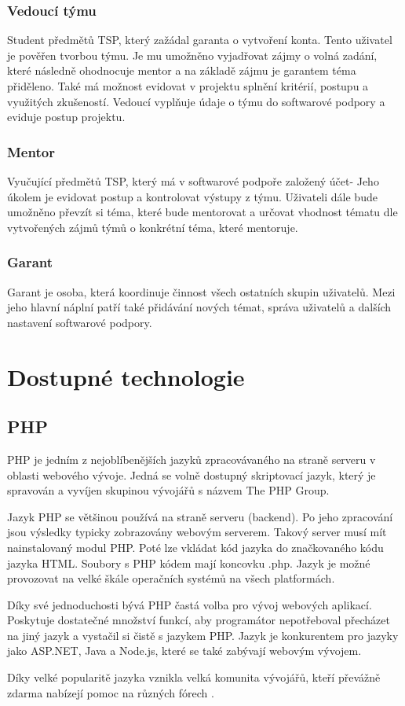 \documentclass[czech,BP]{thesiskiv}
\begin{document}
	\subsection{Vedoucí týmu}
		\par Student předmětů TSP, který zažádal garanta o vytvoření konta. Tento uživatel je pověřen tvorbou týmu. Je mu umožněno vyjadřovat zájmy o volná zadání, které následně ohodnocuje mentor a na základě zájmu je garantem téma přiděleno. Také má možnost evidovat v projektu splnění kritérií, postupu a využitých zkušeností. Vedoucí vyplňuje údaje o týmu do softwarové podpory a eviduje postup projektu.
	\subsection{Mentor}
		\par Vyučující předmětů TSP, který má v softwarové podpoře založený účet- Jeho úkolem je evidovat postup a kontrolovat výstupy z týmu. Uživateli dále bude umožněno převzít si téma, které bude mentorovat a určovat vhodnost tématu dle vytvořených zájmů týmů o konkrétní téma, které mentoruje.
	\subsection{Garant}
		\par Garant je osoba, která koordinuje činnost všech ostatních skupin uživatelů. Mezi jeho hlavní náplní patří také přidávání nových témat, správa uživatelů a dalších nastavení softwarové podpory.

\chapter{Dostupné technologie}
\section{PHP}
\par PHP je jedním z nejoblíbenějších jazyků zpracovávaného na straně serveru v oblasti webového vývoje. Jedná se volně dostupný skriptovací jazyk, který je spravován a vyvíjen skupinou vývojářů s názvem The PHP Group.
\par Jazyk PHP se většinou používá na straně serveru (backend). Po jeho zpracování jsou výsledky typicky zobrazovány webovým serverem. Takový server musí mít nainstalovaný modul PHP. Poté lze vkládat kód jazyka do značkovaného kódu jazyka HTML. Soubory s PHP kódem mají koncovku .php. Jazyk je možné provozovat na velké škále operačních systémů na všech platformách.
\par Díky své jednoduchosti bývá PHP častá volba pro vývoj webových aplikací. Poskytuje dostatečné množství funkcí, aby programátor nepotřeboval přecházet na jiný jazyk a vystačil si čistě s jazykem PHP. Jazyk je konkurentem pro jazyky jako ASP.NET, Java a Node.js, které se také zabývají webovým vývojem.
\par Díky velké popularitě jazyka vznikla velká komunita vývojářů, kteří převážně zdarma nabízejí pomoc na různých fórech \cite{PHPOkamzite}.
\end{document}
